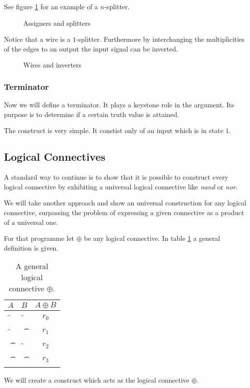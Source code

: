 See figure \ref{figure:constructsA} for an example of a $n$-splitter.
\begin{figure}
	\begin{center}
	\end{center}
	\caption{Assigners and splitters}\label{figure:constructsA}
\end{figure}

Notice that a wire is a $1$-splitter. Furthermore by interchanging the
multiplicities of the edges to an output the input signal can be
inverted.
\begin{figure}
	\begin{center}
	\end{center}
	\caption{Wires and inverters}\label{figure:constructsB}
\end{figure}

\subsubsection{Terminator}

Now we will define a terminator. It plays a keystone role in the argument. Its
purpose is to determine if a certain truth value is attained.

The construct is very simple. It constist only of an input which is in state 
$1$.

\subsection{Logical Connectives}

A standard way to continue is to show that it is possible to construct
every logical connective by exhibiting a universal logical connective
like \emph{nand} or \emph{nor}.

We will take another approach and show an universal construction for any
logical connective, surpassing the problem of expressing a given
connective as a product of a universal one.

For that programme let $\oplus$ be any logical connective. In table
\ref{table:oplus} a general definition is given.
\begin{table}
	\begin{center}
		\begin{tabular}{c|c|c}
			$A$ & $B$ & $A \oplus B$ \\
			\hline
			\f & \f & $r_0$ \\
			\f & \t & $r_1$ \\
			\t & \f & $r_2$ \\
			\t & \t & $r_3$ \\
		\end{tabular}
	\end{center}
	\caption{A general logical connective $\oplus$.}\label{table:oplus} 
\end{table}
We will create a construct which acts as the logical connective
$\oplus$.

